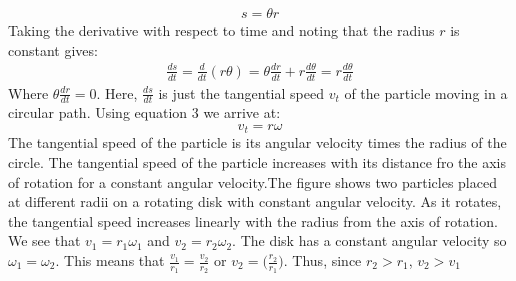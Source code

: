 \documentclass[a4paper]{article}
\newcommand\der[2]{\frac{d #1}{d #2}}
\begin{document}
\begin{align*}
    s = \theta r
\end{align*}
Taking the derivative with respect to time and noting that the radius $r$ is constant gives:
\begin{align*}
    \der{s}{t} = \der{}{t}(r\theta) = \theta\der{r}{t} + r\der{\theta}{t} = r\der{\theta}{t}
\end{align*}
Where $\theta\der{r}{t} = 0$. Here, $\der{s}{t}$ is just the tangential speed $v_t$ of the particle moving in a circular path. Using equation 3 we arrive at:
\begin{equation}
    v_t = r\omega
\end{equation}
The tangential speed of the particle is its angular velocity times the radius of the circle. The tangential speed of the particle increases with its distance fro the axis of rotation for a constant angular velocity.The figure shows two particles placed at different radii on a rotating disk with constant angular velocity. As it rotates, the tangential speed increases linearly with the radius from the axis of rotation. We see that $v_1 = r_1\omega_1$ and $v_2 = r_2\omega_2$. The disk has a constant angular velocity so $\omega_1 = \omega_2$. This means that $\frac{v_1}{r_1} = \frac{v_2}{r_2}$ or $v_2 = \big(\frac{r_2}{r_1}\big)$. Thus, since $r_2 > r_1$, $v_2 > v_1$
\end{document}
